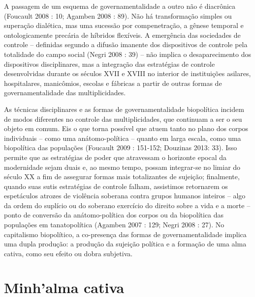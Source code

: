 A passagem de um esquema de governamentalidade a outro não é diacrônica
(Foucault 2008 : 10; Agamben 2008 : 89). Não há transformação simples ou
superação dialética, mas uma sucessão por compenetração, a gênese
temporal e ontologicamente precária de híbridos flexíveis. A emergência
das sociedades de controle -- definidas segundo a difusão imanente dos
dispositivos de controle pela totalidade do campo social (Negri 2008 :
39) -- não implica o desaparecimento dos dispositivos disciplinares, mas
a integração das estratégias de controle desenvolvidas durante os
séculos XVII e XVIII no interior de instituições asilares, hospitalares,
manicômios, escolas e fábricas a partir de outras formas de
governamentalidade das multiplicidades.

As técnicas disciplinares e as formas de governamentalidade biopolítica
incidem de modos diferentes no controle das multiplicidades, que
continuam a ser o seu objeto em comum. Eis o que torna possível que
atuem tanto no plano dos corpos individuais -- como uma anátomo-política
-- quanto em larga escala, como uma biopolítica das populações (Foucault
2009 : 151-152; Douzinas 2013: 33). Isso permite que as estratégias de
poder que atravessam o horizonte epocal da modernidade sejam duais e, ao
mesmo tempo, possam integrar-se no limiar do século XX a fim de
assegurar formas mais totalizantes de sujeição; finalmente, quando suas
sutis estratégias de controle falham, assistimos retornarem os
espetáculos atrozes de violência soberana contra grupos humanos inteiros
-- algo da ordem do suplício ou do soberano exercício do direito sobre a
vida e a morte -- ponto de conversão da anátomo-política dos corpos ou
da biopolítica das populações em tanatopolítica (Agamben 2007 : 129;
Negri 2008 : 27). No capitalismo biopolítico, a co-presença das formas
de governamentalidade implica uma dupla produção: a produção da sujeição
política e a formação de uma alma cativa, como seu efeito ou dobra
subjetiva.

\section{Minh'alma cativa}

